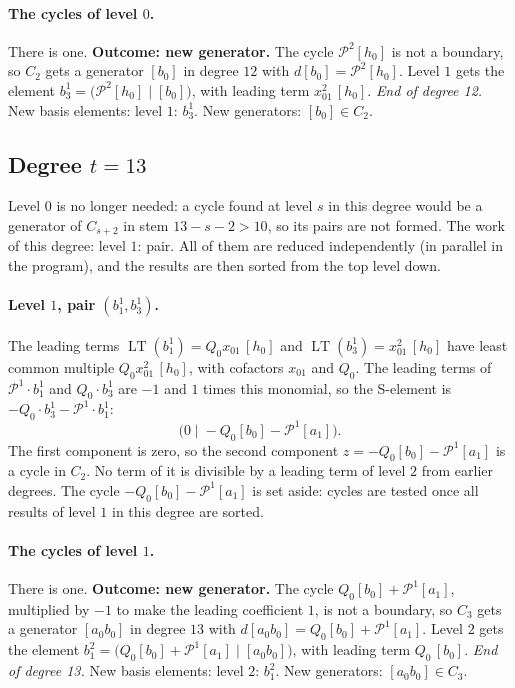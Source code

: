 \documentclass[11pt]{article}
\renewcommand{\P}{\mathcal{P}}
\DeclareMathOperator{\LT}{LT}
\begin{document}
\paragraph{The cycles of level $0$.} There is one.
\textbf{Outcome: new generator.} The cycle $\P^{2}[h_0]$ is not a boundary, so $C_{2}$ gets a generator $[b_0]$ in degree $12$ with $d[b_0] = \P^{2}[h_0]$.
Level $1$ gets the element $b^{1}_{3} = \bigl(\P^{2}[h_0] \;\big|\; [b_0]\bigr)$, with leading term $x_{01}^{2}\,[h_0]$.
\medskip\noindent\emph{End of degree 12.} New basis elements: level $1$: $b^{1}_{3}$. New generators: $[b_0]\in C_{2}$.
\subsection*{Degree $t = 13$}
\noindent Level $0$ is no longer needed: a cycle found at level $s$ in this degree would be a generator of $C_{s+2}$ in stem $13-s-2 > 10$, so its pairs are not formed.
\noindent The work of this degree: level $1$: pair. All of them are reduced independently (in parallel in the program), and the results are then sorted from the top level down.
\medskip
\paragraph{Level $1$, pair $(b^{1}_{1}, b^{1}_{3})$.} The leading terms $\LT(b^{1}_{1}) = Q_{0}x_{01}\,[h_0]$ and $\LT(b^{1}_{3}) = x_{01}^{2}\,[h_0]$ have least common multiple $Q_{0}x_{01}^{2}\,[h_0]$, with cofactors $x_{01}$ and $Q_{0}$.
The leading terms of $\P^{1}\cdot b^{1}_{1}$ and $Q_{0}\cdot b^{1}_{3}$ are $-1$ and $1$ times this monomial, so the S-element is $-Q_{0}\cdot b^{1}_{3} - \P^{1}\cdot b^{1}_{1}$:
\[\bigl(0 \;\big|\; -Q_{0}[b_0] - \P^{1}[a_1]\bigr).\]
The first component is zero, so the second component $z = -Q_{0}[b_0] - \P^{1}[a_1]$ is a cycle in $C_{2}$.
No term of it is divisible by a leading term of level $2$ from earlier degrees.
The cycle $-Q_{0}[b_0] - \P^{1}[a_1]$ is set aside: cycles are tested once all results of level $1$ in this degree are sorted.
\medskip
\paragraph{The cycles of level $1$.} There is one.
\textbf{Outcome: new generator.} The cycle $Q_{0}[b_0] + \P^{1}[a_1]$, multiplied by $-1$ to make the leading coefficient $1$, is not a boundary, so $C_{3}$ gets a generator $[a_0b_0]$ in degree $13$ with $d[a_0b_0] = Q_{0}[b_0] + \P^{1}[a_1]$.
Level $2$ gets the element $b^{2}_{1} = \bigl(Q_{0}[b_0] + \P^{1}[a_1] \;\big|\; [a_0b_0]\bigr)$, with leading term $Q_{0}\,[b_0]$.
\medskip\noindent\emph{End of degree 13.} New basis elements: level $2$: $b^{2}_{1}$. New generators: $[a_0b_0]\in C_{3}$.
\end{document}
